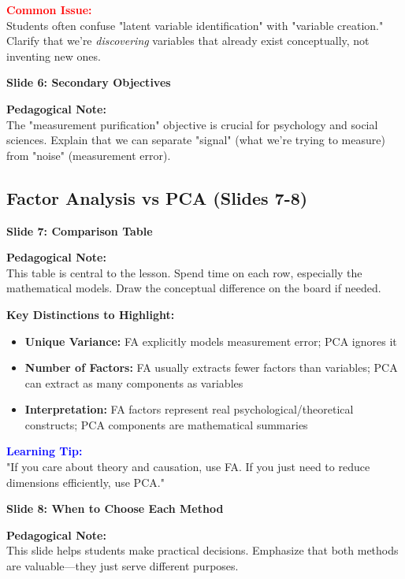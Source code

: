 \documentclass[11pt,a4paper]{article}
\newenvironment{pedagogicalnote}{%
  \begin{framed}
  \noindent\textbf{Pedagogical Note:}\\
}{\end{framed}}
\newenvironment{learningtip}{%
  \begin{framed}
  \noindent\textcolor{blue}{\textbf{Learning Tip:}}\\
}{\end{framed}}
\newenvironment{commonissue}{%
  \begin{framed}
  \noindent\textcolor{red}{\textbf{Common Issue:}}\\
}{\end{framed}}
\begin{document}
\begin{commonissue}
Students often confuse "latent variable identification" with "variable creation." Clarify that we're \textit{discovering} variables that already exist conceptually, not inventing new ones.
\end{commonissue}

\textbf{Slide 6: Secondary Objectives}

\begin{pedagogicalnote}
The "measurement purification" objective is crucial for psychology and social sciences. Explain that we can separate "signal" (what we're trying to measure) from "noise" (measurement error).
\end{pedagogicalnote}

\subsection{Factor Analysis vs PCA (Slides 7-8)}

\textbf{Slide 7: Comparison Table}

\begin{pedagogicalnote}
This table is central to the lesson. Spend time on each row, especially the mathematical models. Draw the conceptual difference on the board if needed.
\end{pedagogicalnote}

\textbf{Key Distinctions to Highlight:}
\begin{itemize}
    \item \textbf{Unique Variance:} FA explicitly models measurement error; PCA ignores it
    \item \textbf{Number of Factors:} FA usually extracts fewer factors than variables; PCA can extract as many components as variables
    \item \textbf{Interpretation:} FA factors represent real psychological/theoretical constructs; PCA components are mathematical summaries
\end{itemize}

\begin{learningtip}
"If you care about theory and causation, use FA. If you just need to reduce dimensions efficiently, use PCA."
\end{learningtip}

\textbf{Slide 8: When to Choose Each Method}

\begin{pedagogicalnote}
This slide helps students make practical decisions. Emphasize that both methods are valuable—they just serve different purposes.
\end{pedagogicalnote}
\end{document}
